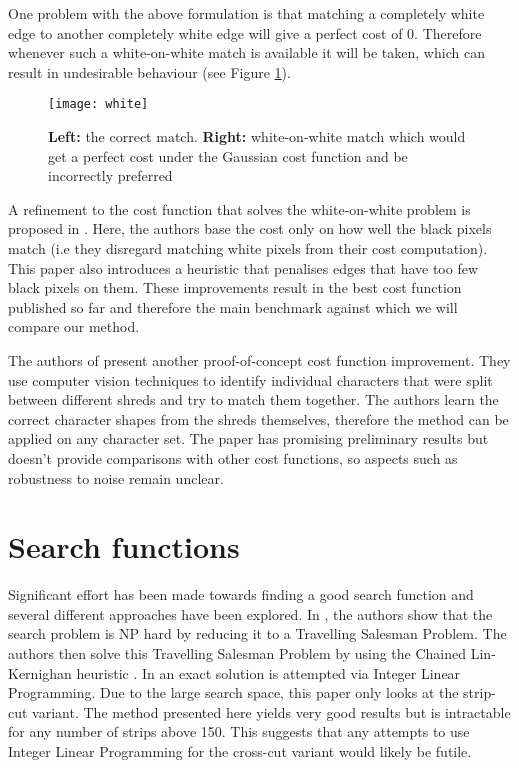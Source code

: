 One problem with the above formulation is that matching a completely white edge to another completely white edge will give a perfect cost of 0. Therefore whenever such a white-on-white match is available it will be taken, which can result in undesirable behaviour (see Figure \ref{fig:white}).

\begin{figure}[h]
    \centering
    \texttt{[image: white]}
    \caption{{\bf Left:} the correct match. {\bf Right:} white-on-white match which would get a perfect cost under the Gaussian cost function and be incorrectly preferred}
    \label{fig:white}
\end{figure}

A refinement to the cost function that solves the white-on-white problem is proposed in \cite{P2}. Here, the authors base the cost only on how well the black pixels match (i.e they disregard matching white pixels from their cost computation). This paper also introduces a heuristic that penalises edges that have too few black pixels on them. These improvements result in the best cost function published so far and therefore the main benchmark against which we will compare our method. 

The authors of \cite{P8} present another proof-of-concept cost function improvement. They use computer vision techniques to identify individual characters that were split between different shreds and try to match them together. The authors learn the correct character shapes from the shreds themselves, therefore the method can be applied on any character set. The paper has promising preliminary results but doesn't provide comparisons with other cost functions, so aspects such as robustness to noise remain unclear.

\clearpage
\section{Search functions}
\label{chap2Search}
Significant effort has been made towards finding a good search function and several different approaches have been explored.  In \cite{P1}, the authors show that the search problem is NP hard by reducing it to a Travelling Salesman Problem. The authors then solve this Travelling Salesman Problem by using the Chained Lin-Kernighan heuristic \cite{P37}.  In \cite{P6} an exact solution is attempted via Integer Linear Programming. Due to the large search space, this paper only looks at the strip-cut variant. The method presented here yields very good results but is intractable for any number of strips above 150. This suggests that any attempts to use Integer Linear Programming for the cross-cut variant would likely be futile. 

